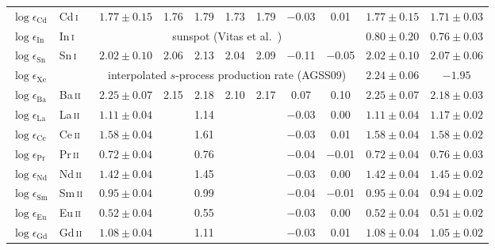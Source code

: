 \documentclass[traditabstract]{aa}
\newcommand{\ph}{\phantom{$-$}}
\newcommand{\altsni}{Sn\,\textsc{i}}
\newcommand{\altbaii}{Ba\,\textsc{ii}}
\newcommand{\alteuii}{Eu\,\textsc{ii}}
\newcommand{\altsmii}{Sm\,\textsc{ii}}
\newcommand{\altcdi}{Cd\,\textsc{i}}
\newcommand{\altini}{In\,\textsc{i}}
\newcommand{\altlaii}{La\,\textsc{ii}}
\newcommand{\altceii}{Ce\,\textsc{ii}}
\newcommand{\altprii}{Pr\,\textsc{ii}}
\newcommand{\altndii}{Nd\,\textsc{ii}}
\newcommand{\altgdii}{Gd\,\textsc{ii}}
\newcommand{\sni}{\altsni\ }
\newcommand{\baii}{\altbaii\ }
\newcommand{\euii}{\alteuii\ }
\newcommand{\smii}{\altsmii\ }
\newcommand{\cdi}{\altcdi\ }
\newcommand{\ini}{\altini\ }
\newcommand{\laii}{\altlaii\ }
\newcommand{\ceii}{\altceii\ }
\newcommand{\prii}{\altprii\ }
\newcommand{\ndii}{\altndii\ }
\newcommand{\gdii}{\altgdii\ }
\begin{document}
\begin{table}[p]
\begin{tabular}{l l c c c c c c c c c}
$\log \epsilon_\mathrm{Cd}$     & \cdi    & $1.77\pm0.15$ & 1.76 & 1.79 & 1.73 & 1.79 & $-$0.03 & \ph0.01 & $1.77\pm0.15$ & $1.71\pm0.03$\vspace{1mm}\\
$\log \epsilon_\mathrm{In}$     & \ini    & \multicolumn{7}{c}{sunspot (Vitas et al.\ \cite{vita})}       & $0.80\pm0.20$ & $0.76\pm0.03$\vspace{1mm}\\
$\log \epsilon_\mathrm{Sn}$     & \sni    & $2.02\pm0.10$ & 2.06 & 2.13 & 2.04 & 2.09 & $-$0.11 & $-$0.05 & $2.02\pm0.10$ & $2.07\pm0.06$\vspace{1mm}\\
$\log \epsilon_\mathrm{Xe}$     && \multicolumn{7}{c}{interpolated $s$-process production rate (AGSS09)}  & $2.24\pm0.06$ & $-1.95$      \vspace{1mm}\\
$\log \epsilon_\mathrm{Ba}$     & \baii   & $2.25\pm0.07$ & 2.15 & 2.18 & 2.10 & 2.17 & \ph0.07 & \ph0.10 & $2.25\pm0.07$ & $2.18\pm0.03$\vspace{1mm}\\
$\log \epsilon_\mathrm{La}$     & \laii   & $1.11\pm0.04$ &      & 1.14 &      &      & $-$0.03 & \ph0.00 & $1.11\pm0.04$ & $1.17\pm0.02$\vspace{1mm}\\
$\log \epsilon_\mathrm{Ce}$     & \ceii   & $1.58\pm0.04$ &      & 1.61 &      &      & $-$0.03 & \ph0.01 & $1.58\pm0.04$ & $1.58\pm0.02$\vspace{1mm}\\
$\log \epsilon_\mathrm{Pr}$     & \prii   & $0.72\pm0.04$ &      & 0.76 &      &      & $-$0.04 & $-$0.01 & $0.72\pm0.04$ & $0.76\pm0.03$\vspace{1mm}\\
$\log \epsilon_\mathrm{Nd}$     & \ndii   & $1.42\pm0.04$ &      & 1.45 &      &      & $-$0.03 & \ph0.00 & $1.42\pm0.04$ & $1.45\pm0.02$\vspace{1mm}\\
$\log \epsilon_\mathrm{Sm}$     & \smii   & $0.95\pm0.04$ &      & 0.99 &      &      & $-$0.04 & $-$0.01 & $0.95\pm0.04$ & $0.94\pm0.02$\vspace{1mm}\\
$\log \epsilon_\mathrm{Eu}$     & \euii   & $0.52\pm0.04$ &      & 0.55 &      &      & $-$0.03 & \ph0.00 & $0.52\pm0.04$ & $0.51\pm0.02$\vspace{1mm}\\
$\log \epsilon_\mathrm{Gd}$     & \gdii   & $1.08\pm0.04$ &      & 1.11 &      &      & $-$0.03 & \ph0.01 & $1.08\pm0.04$ & $1.05\pm0.02$\vspace{1mm}\\

\end{tabular}
\end{table}
\end{document}
